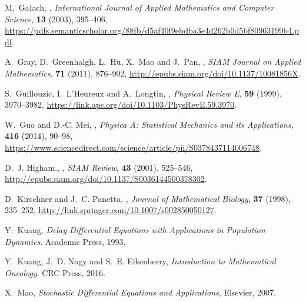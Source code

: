 \documentclass{aims}
\theoremstyle{definition}
\begin{document}
\begin{thebibliography}{10}
\newblock M.~Ga{\l}ach,
,
\newblock \emph{International Journal of Applied Mathematics and Computer
  Science}, \textbf{13} (2003), 395--406,
\newblock
  \urlprefix\url{https://pdfs.semanticscholar.org/88fb/d5af40f9ebdba3e4d262b0d5bf80963199b4.pdf}.

\newblock A.~Gray, D.~Greenhalgh, L.~Hu, X.~Mao and J.~Pan,
,
\newblock \emph{SIAM Journal on Applied Mathematics}, \textbf{71} (2011),
  876--902,
\newblock \urlprefix\url{http://epubs.siam.org/doi/10.1137/10081856X}.

\newblock S.~Guillouzic, I.~L'Heureux and A.~Longtin,
,
\newblock \emph{Physical Review E}, \textbf{59} (1999), 3970--3982,
\newblock \urlprefix\url{https://link.aps.org/doi/10.1103/PhysRevE.59.3970}.

\newblock W.~Guo and D.-C. Mei,
,
\newblock \emph{Physica A: Statistical Mechanics and its Applications},
  \textbf{416} (2014), 90--98,
\newblock
  \urlprefix\url{https://www.sciencedirect.com/science/article/pii/S0378437114006748}.

\newblock D.~J. Higham.,
,
\newblock \emph{SIAM Review}, \textbf{43} (2001), 525--546,
\newblock \urlprefix\url{http://epubs.siam.org/doi/10.1137/S0036144500378302}.

\newblock D.~Kirschner and J.~C. Panetta,
,
\newblock \emph{Journal of Mathematical Biology}, \textbf{37} (1998), 235--252,
\newblock \urlprefix\url{http://link.springer.com/10.1007/s002850050127}.

\newblock Y.~Kuang,
\newblock \emph{{Delay Differential Equations with Applications in Population Dynamics}}.
\newblock Academic Press, 1993.

\newblock Y.~Kuang, J.~D. Nagy and S.~E. Eikenberry,
\newblock \emph{{Introduction to Mathematical Oncology}}.
\newblock CRC Press, 2016.

\newblock X.~Mao,
\newblock \emph{{Stochastic Differential Equations and Applications}}, 
\newblock Elsevier, 2007.


\end{thebibliography}
\end{document}
